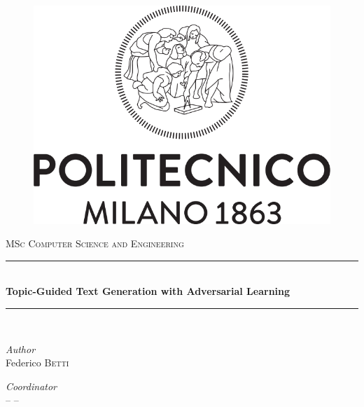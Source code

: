 
\begin{titlepage}
	
	\newcommand{\HRule}{\rule{\linewidth}{0.5mm}} %
	
	\center %
	

	\begin{figure}[h!]
		\centering
		\includegraphics[width=0.8\linewidth]{Utils/Logo_Politecnico_Milano.png}
	\end{figure}
	
	\vfill
	
	
	
	\textsc{\LARGE MSc Computer Science and Engineering}\\[0.5cm] 
	
	
	\HRule\\[0.4cm]
	
	{\huge\bfseries Topic-Guided Text Generation with Adversarial Learning}\\%
	
	\HRule\\[1.5cm]
	
	
	\begin{minipage}{0.4\textwidth}
		\begin{flushleft}
			\large
			\textit{Author}\\
			Federico \textsc{Betti}
		\end{flushleft}
	\end{minipage}
	\hfill
	\begin{minipage}{0.4\textwidth}
		\raggedright
		\begin{flushright}
			\large
			\textit{Coordinator}\\
			-- \textsc{--}
		\end{flushright}
	\end{minipage}
	

\end{titlepage}
